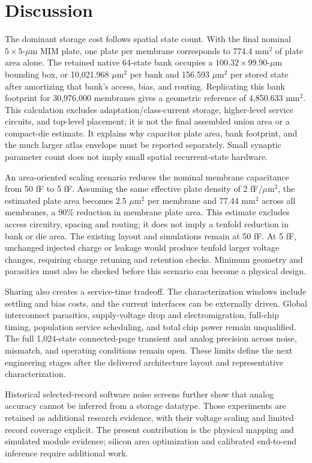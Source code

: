 \documentclass[preprint,12pt,number]{elsarticle}
\begin{document}
\section{Discussion}
The dominant storage cost follows spatial state count. With the final nominal $5\times5$-$\mu$m MIM plate, one plate per membrane corresponds to 774.4 mm$^2$ of plate area alone. The retained native 64-state bank occupies a $100.32\times99.90$-$\mu$m bounding box, or 10,021.968 $\mu$m$^2$ per bank and 156.593 $\mu$m$^2$ per stored state after amortizing that bank's access, bias, and routing. Replicating this bank footprint for 30,976,000 membranes gives a geometric reference of 4,850.633 mm$^2$. This calculation excludes adaptation/class-current storage, higher-level service circuits, and top-level placement; it is not the final assembled union area or a compact-die estimate. It explains why capacitor plate area, bank footprint, and the much larger atlas envelope must be reported separately. Small synaptic parameter count does not imply small spatial recurrent-state hardware.

An area-oriented scaling scenario reduces the nominal membrane capacitance from 50 fF to 5 fF. Assuming the same effective plate density of 2 fF/$\mu$m$^2$, the estimated plate area becomes 2.5 $\mu$m$^2$ per membrane and 77.44 mm$^2$ across all membranes, a 90\% reduction in membrane plate area. This estimate excludes access circuitry, spacing and routing; it does not imply a tenfold reduction in bank or die area. The existing layout and simulations remain at 50 fF. At 5 fF, unchanged injected charge or leakage would produce tenfold larger voltage changes, requiring charge retuning and retention checks. Minimum geometry and parasitics must also be checked before this scenario can become a physical design.

Sharing also creates a service-time tradeoff. The characterization windows include settling and bias costs, and the current interfaces can be externally driven. Global interconnect parasitics, supply-voltage drop and electromigration, full-chip timing, population service scheduling, and total chip power remain unqualified. The full 1,024-state connected-page transient and analog precision across noise, mismatch, and operating conditions remain open. These limits define the next engineering stages after the delivered architecture layout and representative characterization.

Historical selected-record software noise screens further show that analog accuracy cannot be inferred from a storage datatype. Those experiments are retained as additional research evidence, with their voltage scaling and limited record coverage explicit. The present contribution is the physical mapping and simulated module evidence; silicon area optimization and calibrated end-to-end inference require additional work.
\end{document}
